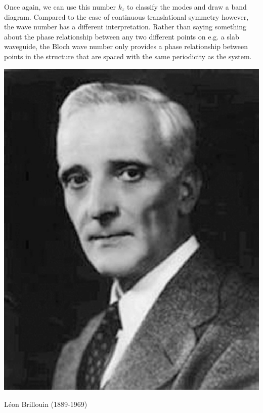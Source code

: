 Once again, we can use this number $k_z$ to classify the modes and draw a band diagram. Compared to the case of continuous translational symmetry however, the wave number has a different interpretation. Rather than saying something about the phase relationship between any two different points on e.g. a slab waveguide, the Bloch wave number only provides a phase relationship between points in the structure that are spaced with the same periodicity as the system.


\pagebreak


\begin{marginfigure}[-0.0cm]
\includegraphics{symmetry/figures/l_brillouin}
\caption{L\'{e}on Brillouin (1889-1969)}
\end{marginfigure}


